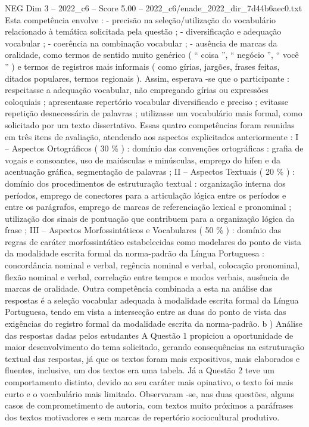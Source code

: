 \begin{textsample}{NEG Dim 3 – 2022\_c6 – Score 5.00 – 2022\_c6/enade\_2022\_dir\_7d44b6aec0.txt}
Esta competência envolve : - precisão na seleção/utilização do vocabulário relacionado à temática solicitada pela questão ; - diversificação e adequação vocabular ; - coerência na combinação vocabular ; - ausência de marcas da oralidade, como termos de sentido muito genérico ( “ coisa ”, “ negócio ”, “ você ” ) e termos de registros mais informais ( como gírias, jargões, frases feitas, ditados populares, termos regionais ).
Assim, esperava -se que o participante : respeitasse a adequação vocabular, não empregando gírias ou expressões coloquiais ; apresentasse repertório vocabular diversificado e preciso ; evitasse repetição desnecessária de palavras ; utilizasse um vocabulário mais formal, como solicitado por um texto dissertativo.
Essas quatro competências foram reunidas em três itens de avaliação, atendendo aos aspectos explicitados anteriormente : I – Aspectos Ortográficos ( 30 \% ) : domínio das convenções ortográficas : grafia de vogais e consoantes, uso de maiúsculas e minúsculas, emprego do hífen e da acentuação gráfica, segmentação de palavras ; II – Aspectos Textuais ( 20 \% ) : domínio dos procedimentos de estruturação textual : organização interna dos períodos, emprego de conectores para a articulação lógica entre os períodos e entre os parágrafos, emprego de marcas de referenciação lexical e pronominal ; utilização dos sinais de pontuação que contribuem para a organização lógica da frase ; III – Aspectos Morfossintáticos e Vocabulares ( 50 \% ) : domínio das regras de caráter morfossintático estabelecidas como modelares do ponto de vista da modalidade escrita formal da norma-padrão da Língua Portuguesa : concordância nominal e verbal, regência nominal e verbal, colocação pronominal, flexão nominal e verbal, correlação entre tempos e modos verbais, ausência de marcas de oralidade.
Outra competência combinada a esta na análise das respostas é a seleção vocabular adequada à modalidade escrita formal da Língua Portuguesa, tendo em vista a intersecção entre as duas do ponto de vista das exigências do registro formal da modalidade escrita da norma-padrão. b ) Análise das respostas dadas pelos estudantes A Questão 1 propiciou a oportunidade de maior desenvolvimento do tema solicitado, gerando consequências na estruturação textual das respostas, já que os textos foram mais expositivos, mais elaborados e fluentes, inclusive, um dos textos era uma tabela.
Já a Questão 2 teve um comportamento distinto, devido ao seu caráter mais opinativo, o texto foi mais curto e o vocabulário mais limitado.
Observaram -se, nas duas questões, alguns casos de comprometimento de autoria, com textos muito próximos a paráfrases dos textos motivadores e sem marcas de repertório sociocultural produtivo.

\end{textsample}

